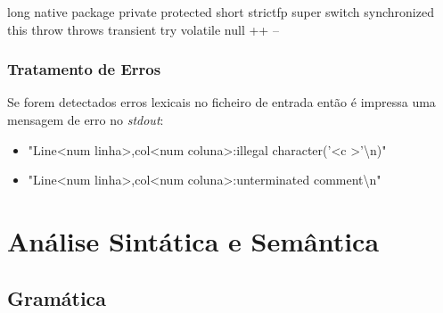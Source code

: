 \documentclass[12pt]{article}
\begin{document}
\begin{itemize}
\begin{itemize}
	       	                 \text{\textbar} long
	       	                 \text{\textbar} native
	       	                 \text{\textbar} package
	       	                 \text{\textbar} private 
	       	                 \text{\textbar} protected 
	       	                 \text{\textbar} short 
	       	                 \text{\textbar} strictfp
	       	                 \text{\textbar} super 
	       	                 \text{\textbar} switch 
	       	                 \text{\textbar} synchronized 
	       	                 \text{\textbar} this 
	       	                 \text{\textbar} throw 
	       	                 \text{\textbar} throws 
	       	                 \text{\textbar} transient 
	       	                 \text{\textbar} try
	       	                 \text{\textbar} volatile
		       	             \text{\textbar} null
	       	                 \text{\textbar} ++
	       	                 \text{\textbar} --
	       	            \end{itemize}      	        
		\end{itemize}
		
		
		\subsubsection{Tratamento de Erros}
		Se forem detectados erros lexicais no ficheiro de entrada então é impressa uma mensagem de erro no \emph{stdout}:
		\begin{itemize}
            \item "Line\textless num linha\textgreater,col\textless num coluna\textgreater:illegal character('\textless c \textgreater'\textbackslash n)"
            \item "Line\textless num linha\textgreater,col\textless num coluna\textgreater:unterminated comment\textbackslash n"
        \end{itemize}
		




\pagebreak

\section{Análise Sintática e Semântica}

\subsection{Gramática}
\end{document}
